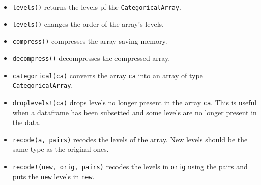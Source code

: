 \documentclass[11pt]{article}
\providecommand{\tightlist}{%
      \setlength{\itemsep}{0pt}\setlength{\parskip}{0pt}}
\begin{document}
\begin{itemize}
\tightlist
\item
  \texttt{levels()} returns the levels pf the \texttt{CategoricalArray}.
\item
  \texttt{levels()} changes the order of the array's levels.
\item
  \texttt{compress()} compresses the array saving memory.
\item
  \texttt{decompress()} decompresses the compressed array.
\item
  \texttt{categorical(ca)} converts the array \texttt{ca} into an array
  of type \texttt{CategoricalArray}.
\item
  \texttt{droplevels!(ca)} drops levels no longer present in the array
  \texttt{ca}. This is useful when a dataframe has been subsetted and
  some levels are no longer present in the data.
\item
  \texttt{recode(a,\ pairs)} recodes the levels of the array. New levels
  should be the same type as the original ones.
\item
  \texttt{recode!(new,\ orig,\ pairs)} recodes the levels in
  \texttt{orig} using the pairs and puts the \texttt{new} levels in
  \texttt{new}.
\end{itemize}


    
    
    
    
\end{document}
